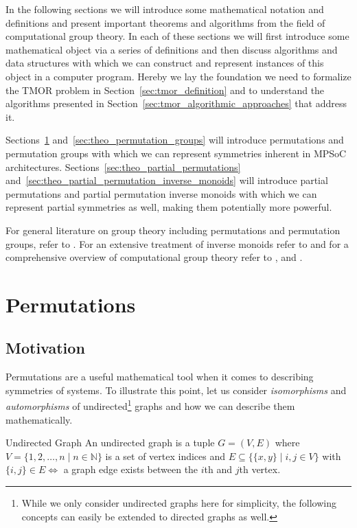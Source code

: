 In the following sections we will introduce some mathematical notation and
definitions and present important theorems and algorithms from the field of
computational group theory. In each of these sections we will first introduce
some mathematical object via a series of definitions and then discuss
algorithms and data structures with which we can construct and represent
instances of this object in a computer program. Hereby we lay the foundation we
need to formalize the TMOR problem in Section~\ref{sec:tmor_definition} and to
understand the algorithms presented in
Section~\ref{sec:tmor_algorithmic_approaches} that address it.

Sections~\ref{sec:theo_permutations} and~\ref{sec:theo_permutation_groups} will
introduce permutations and permutation groups with which we can represent
symmetries inherent in MPSoC architectures.
Sections~\ref{sec:theo_partial_permutations}
and~\ref{sec:theo_partial_permutation_inverse_monoids} will introduce partial
permutations and partial permutation inverse monoids with which we can
represent partial symmetries as well, making them potentially more powerful.

For general literature on group theory including permutations and permutation
groups, refer to \cite{Rotman}. For an extensive treatment of inverse monoids
refer to \cite{Lawson} and for a comprehensive overview of computational group
theory refer to \cite{Holt}, \cite{Butler} and \cite{Seress}.

\section{Permutations}
\label{sec:theo_permutations}

\subsection{Motivation}
\label{sec:perm_motivation}

Permutations are a useful mathematical tool when it comes to describing
symmetries of systems. To illustrate this point, let us consider
\textit{isomorphisms} and \textit{automorphisms} of undirected\footnote{ While
we only consider undirected graphs here for simplicity, the following concepts
can easily be extended to directed graphs as well.} graphs and how we can
describe them mathematically.

\begin{defn}[label=exmp:undirected_graph]{Undirected Graph}
  An undirected graph is a tuple $G = (V,E)$ where $V = \{1,2,\dots,n \mid n
  \in \mathbb{N}\}$ is a set of vertex indices and $E \subseteq \{\{x, y\} \mid
  i, j \in V\}$ with $\{i, j\} \in E \Leftrightarrow$ a graph edge exists between
  the $i$th and $j$th vertex.
\end{defn}
%

